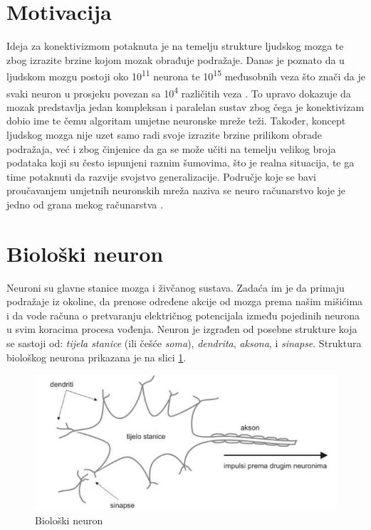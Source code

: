 \documentclass[times, utf8, zavrsni]{fer}
\begin{document}
\section{Motivacija}
Ideja za konektivizmom  potaknuta je na temelju strukture ljudskog mozga te zbog izrazite brzine kojom mozak obrađuje podražaje. Danas je poznato da u ljudskom mozgu postoji oko 10\textsuperscript{11} neurona te 10\textsuperscript{15} međusobnih veza što znači da je svaki neuron u prosjeku povezan sa 10\textsuperscript{4} različitih veza \citep{cupicNENR}. To upravo dokazuje da mozak predstavlja jedan kompleksan i paralelan sustav zbog čega je konektivizam dobio ime te čemu algoritam umjetne neuronske mreže teži. Također, koncept ljudskog mozga nije uzet samo radi svoje izrazite brzine prilikom obrade podražaja, već i zbog činjenice da ga se može učiti na temelju velikog broja podataka koji su često ispunjeni raznim šumovima, što je realna situacija, te ga time potaknuti da razvije svojstvo generalizacije. Područje koje se bavi proučavanjem umjetnih neuronskih mreža naziva se neuro računarstvo  koje je jedno od grana mekog računarstva .

\section{Biološki neuron}
Neuroni  su glavne stanice mozga i živčanog sustava. Zadaća im je da primaju podražaje iz okoline, da prenose određene akcije od mozga prema našim mišićima i da vode računa o pretvaranju električnog potencijala između pojedinih neurona u svim koracima procesa vođenja. Neuron je izgrađen od posebne strukture koja se sastoji od: \textit{tijela stanice} (ili češće \textit{soma}), \textit{dendrita}, \textit{aksona}, i \textit{sinapse}. Struktura biološkog neurona prikazana je na slici \ref{fig:bio-neuron}.

\begin{figure}[H]
    \centering
    \includegraphics[scale=0.75]{img/bio-neuron.png}
    \caption[Caption for LOF]{Biološki neuron\footnotemark}
    \label{fig:bio-neuron}
\end{figure}
\end{document}
